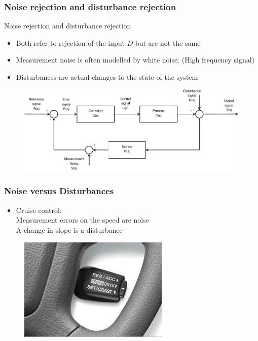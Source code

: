 \begin{frame}
	\frametitle{Noise rejection and disturbance rejection}
	\begin{block}{Noise rejection and disturbance rejection}
		\begin{itemize}
			\item Both refer to rejection of the input $D$ but are not the same
			\item Measurement noise is often modelled by white noise. (High frequency signal)
			\item Disturbances are actual changes to the state of the system
		\end{itemize}
		\vspace{-1em}
		\begin{figure}
		\centering
		\includegraphics[width=0.8\linewidth]{Closed-Loop-measure}
		\label{fig:Closed-Loop3}
		\end{figure}
	\end{block}
\end{frame}


\begin{frame}
	\frametitle{Noise versus Disturbances}
		\begin{itemize}
			\item Cruise control: \\
			Measurement errors on the speed are noise \\
			A change in slope is a disturbance
		\end{itemize}
		\begin{figure}
			\centering
			\includegraphics[width=0.7\linewidth]{"cruise control"}
			\label{fig:cruisecontrol}
		\end{figure}
\end{frame}

